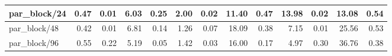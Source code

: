 \begin{tabular}{|lllllllllllll|}
\multicolumn{1}{|l|}{par\_block/24}  & \multicolumn{1}{r|}{0.47} & \multicolumn{1}{r|}{0.01} & \multicolumn{1}{r|}{6.03} & \multicolumn{1}{r|}{0.25}  & \multicolumn{1}{r|}{2.00} & \multicolumn{1}{r|}{0.02} & \multicolumn{1}{r|}{11.40} & \multicolumn{1}{r|}{0.47}  & \multicolumn{1}{r|}{13.98} & \multicolumn{1}{r|}{0.02} & \multicolumn{1}{r|}{13.08} & \multicolumn{1}{r|}{0.54}  \\ \hline
\multicolumn{1}{|l|}{par\_block/48}  & \multicolumn{1}{r|}{0.42} & \multicolumn{1}{r|}{0.01} & \multicolumn{1}{r|}{6.81} & \multicolumn{1}{r|}{0.14}  & \multicolumn{1}{r|}{1.26} & \multicolumn{1}{r|}{0.07} & \multicolumn{1}{r|}{18.09} & \multicolumn{1}{r|}{0.38}  & \multicolumn{1}{r|}{7.15} & \multicolumn{1}{r|}{0.01} & \multicolumn{1}{r|}{25.56} & \multicolumn{1}{r|}{0.53}  \\ \hline
\multicolumn{1}{|l|}{par\_block/96}  & \multicolumn{1}{r|}{0.55} & \multicolumn{1}{r|}{0.22} & \multicolumn{1}{r|}{5.19} & \multicolumn{1}{r|}{0.05}  & \multicolumn{1}{r|}{1.42} & \multicolumn{1}{r|}{0.03} & \multicolumn{1}{r|}{16.00} & \multicolumn{1}{r|}{0.17}  & \multicolumn{1}{r|}{4.97} & \multicolumn{1}{r|}{0.30} & \multicolumn{1}{r|}{36.76} & \multicolumn{1}{r|}{0.38}  \\ \hline
\end{tabular}
